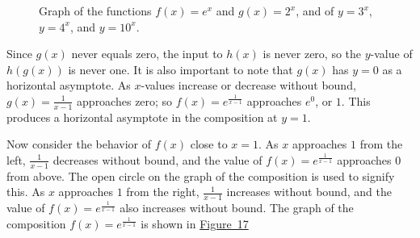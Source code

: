 \documentclass[10pt,]{book}
\theoremstyle{ptxdefinitionnotitle}
\theoremstyle{ptxdefinitiontitle}
\theoremstyle{ptxdefinitionnotitle}
\theoremstyle{ptxdefinitiontitle}
\theoremstyle{ptxdefinitionnotitle}
\theoremstyle{ptxdefinitiontitle}
\numberwithin{equation}{section}
\begin{document}
\begin{example}
\begin{figure}
\begin{sidebyside}{2}{0}{0}{0}
\begin{sbspanel}{0.5}
{{
}
}
\end{sbspanel}
\end{sidebyside}
\caption{Graph of the functions \(f(x)=e^x\) and \(g(x)=2^x\),  and of \(y=3^x\), \(y=4^x\), and \(y=10^x\).\label{figure-exponential-composition}}
\end{figure}
%
\par
\hypertarget{p-253}{}%
Since \(g(x)\) never equals zero, the input to \(h(x)\) is never zero, so the \(y\)-value of \(h(g(x))\) is never one.  It is also important to note that \(g(x)\)  has \(y=0\) as a horizontal asymptote. As \(x\)-values increase or decrease without bound, \(g(x)=\frac{1}{x-1}\) approaches zero; so \(f(x)=e^{\frac{1}{x-1}}\) approaches \(e^0\), or \(1\).  This produces a horizontal asymptote in the composition at \(y=1\).%
\par
\hypertarget{p-254}{}%
Now consider the behavior of \(f(x)\) close to \(x=1\).  As \(x\) approaches \(1\) from the left, \(\frac{1}{x-1}\) decreases without bound, and the value of \(f(x)=e^{\frac{1}{x-1}}\) approaches \(0\) from above. The open circle on the graph of the composition is used to signify this. As \(x\) approaches \(1\) from the right, \(\frac{1}{x-1}\) increases without bound, and the value of \(f(x)=e^{\frac{1}{x-1}}\) also increases without bound.  The graph of the composition \(f(x)=e^{\frac{1}{x-1}}\) is shown in \hyperref[figure-exp-recip]{Figure~17}%
\par
\hypertarget{p-255}{}%
\leavevmode%
\begin{figure}
\centering
{
}
\end{figure}
\end{example}
\end{document}
